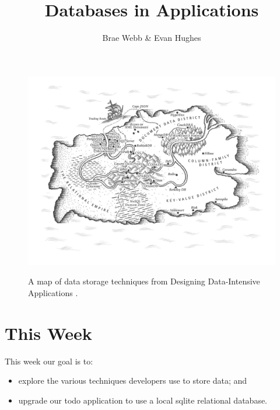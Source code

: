 \documentclass{csse4400}
\title{Databases in Applications}
\author{Brae Webb \& Evan Hughes}
\date{\week[practical]{2}}
\begin{document}
\maketitle

\begin{figure}[h]
  \href{https://www.oreilly.com/library/view/designing-data-intensive-applications/9781491903063/ch02.html}{
    \includegraphics[width=\textwidth]{images/databases}
  }
\caption{A map of data storage techniques from Designing Data-Intensive Applications \cite{data-intensive}.}
\end{figure}


\section{This Week}
This week our goal is to:
\begin{itemize}
  \item explore the various techniques developers use to store data; and
  \item upgrade our todo application to use a local sqlite relational database.
\end{itemize}

\clearpage
\end{document}
